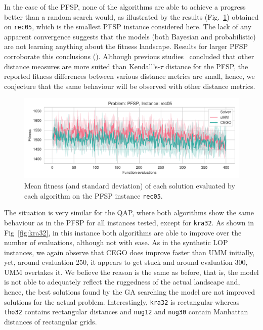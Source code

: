 \documentclass[runningheads]{llncs}
\begin{document}
In the case of the PFSP, none of the algorithms are able to achieve a progress
better than a random search would, as illustrated by the results
(Fig.~\ref{fig:rec05}) obtained on \texttt{rec05}, which is the smallest PFSP
instance considered here. The lack of any apparent convergence suggests that
the models (both Bayesian and probabilistic) are not learning anything about
the fitness landscape. Results for larger PFSP corroborate this conclusions
(\supplement). Although previous studies~\citep{ZaeStoBar2014:ppsn} concluded
that other distance measures are more suited than Kendall's-$\tau$ distance for
the PFSP, the reported fitness differences between various distance metrics are
small, hence, we conjecture that the same behaviour will be observed with other
distance metrics.
  

\begin{figure}[tb]
  \centering%
  \includegraphics[width=\textwidth]{../img/fitness_real_pfsp_rec05_txt}
  \caption{Mean fitness  (and standard deviation)  of each solution evaluated by each algorithm on the PFSP instance \texttt{rec05}.\label{fig:rec05}}
\end{figure}

The situation is very similar for the QAP, where both algorithms show the same
behaviour as in the PFSP for all instances tested, except for
\texttt{kra32}. As shown in Fig~\ref{fig:kra32}, in this instance both
algorithms are able to improve over the number of evaluations, although not
with ease. As in the synthetic LOP instances, we again observe that CEGO does
improve faster than UMM initially, yet, around evaluation 250, it appears to
get stuck and around evaluation 300, UMM overtakes it. We believe the reason is
the same as before, that is, the model is not able to adequately reflect the
ruggedness of the actual landscape and, hence, the best solutions found by the
GA searching the model are not improved solutions for the actual problem. Interestingly, \texttt{kra32} is rectangular
whereas \texttt{tho32} contains rectangular distances and \texttt{nug12} and \texttt{nug30} contain Manhattan distances of rectangular grids.
\end{document}
